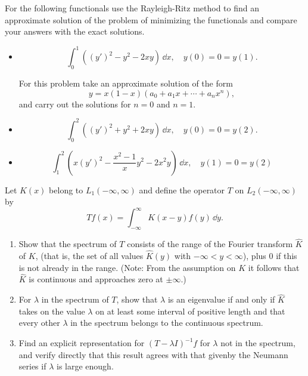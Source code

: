 \begin{Exercise}
  For the following functionals use the Rayleigh-Ritz method to find an 
  approximate solution of the problem of minimizing the functionals
  and compare your answers with the exact solutions.
  \begin{itemize}
  \item
    \[
    \int_0^1 \left( (y')^2 - y^2 - 2 x y \right) \,\dd x, \quad
    y(0) = 0 = y(1).
    \]

    For this problem take an approximate solution of the form
    \[
    y = x(1-x) \left( a_0 + a_1 x + \cdots + a_n x^n \right),
    \]
    and carry out the solutions for $n = 0$ and $n = 1$.
  \item
    \[
    \int_0^2 \left( (y')^2 + y^2 + 2 x y \right) \,\dd x, \quad
    y(0) = 0 = y(2).
    \]
  \item
    \[
    \int_1^2 \left( x (y')^2 - \frac{x^2 - 1}{x} y^2 - 2 x^2 y \right) \,\dd x,
    \quad y(1) = 0 = y(2)
    \]
  \end{itemize}
\end{Exercise}



\begin{Exercise}
  Let $K(x)$ belong to $L_1(-\infty,\infty)$ and define the operator $T$ on
  $L_2(-\infty,\infty)$ by
  \[
  T f(x) = \int_{-\infty}^\infty K(x-y) f(y) \,\dd y.
  \]
  \begin{enumerate}
  \item
    Show that the spectrum of $T$ consists of the range of the Fourier
    transform $\hat{K}$ of $K$, (that is, the set of all values $\hat{K}(y)$
    with $-\infty < y < \infty$), plus $0$ if this is not already in the range.
    (Note:  From the assumption on $K$ it follows that $\hat{K}$ is continuous
    and approaches zero at $\pm \infty$.)
  \item
    For $\lambda$ in the spectrum of $T$, show that $\lambda$ is an eigenvalue
    if and only if $\hat{K}$ takes on the value $\lambda$ on at least some
    interval of positive length and that every other $\lambda$ in the spectrum
    belongs to the continuous spectrum.
  \item
    Find an explicit representation for $(T - \lambda I)^{-1} f$ for $\lambda$
    not in the spectrum, and verify directly that this result agrees with that
    givenby the Neumann series if $\lambda$ is large enough.
  \end{enumerate}
\end{Exercise}



